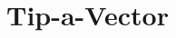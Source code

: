 \documentclass[../../../main.tex]{subfiles}
\begin{document}
\section{Tip-a-Vector}

\end{document}
